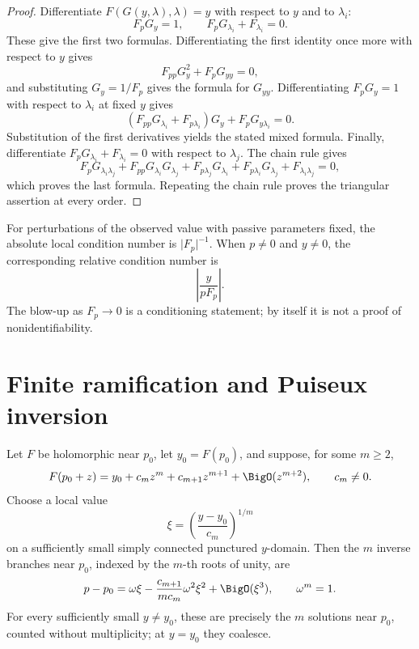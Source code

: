 \begin{proof}
Differentiate \(F(G(y,\lambda),\lambda)=y\) with respect to \(y\) and to
\(\lambda_i\):
\[
 F_pG_y=1,\qquad F_pG_{\lambda_i}+F_{\lambda_i}=0.
\]
These give the first two formulas.  Differentiating the first identity once
more with respect to \(y\) gives
\[
 F_{pp}G_y^2+F_pG_{yy}=0,
\]
and substituting \(G_y=1/F_p\) gives the formula for \(G_{yy}\).
Differentiating \(F_pG_y=1\) with respect to \(\lambda_i\) at fixed \(y\)
gives
\[
 (F_{pp}G_{\lambda_i}+F_{p\lambda_i})G_y
 +F_pG_{y\lambda_i}=0.
\]
Substitution of the first derivatives yields the stated mixed formula.
Finally, differentiate
\(F_pG_{\lambda_i}+F_{\lambda_i}=0\) with respect to
\(\lambda_j\).  The chain rule gives
\[
 F_pG_{\lambda_i\lambda_j}
 +F_{pp}G_{\lambda_i}G_{\lambda_j}
 +F_{p\lambda_j}G_{\lambda_i}
 +F_{p\lambda_i}G_{\lambda_j}
 +F_{\lambda_i\lambda_j}=0,
\]
which proves the last formula.  Repeating the chain rule proves the
triangular assertion at every order.
\end{proof}

\begin{remark}[Conditioning]
\label{rem:uq-inverse-conditioning}
For perturbations of the observed value with passive parameters fixed, the
absolute local condition number is \(\lvert F_p\rvert^{-1}\).  When
\(p\ne0\) and \(y\ne0\), the corresponding relative condition number is
\[
 \left\lvert\frac{y}{pF_p}\right\rvert.
\]
The blow-up as \(F_p\to0\) is a conditioning statement; by itself it is not
a proof of nonidentifiability.
\end{remark}

\section{Finite ramification and Puiseux inversion}
\label{sec:uq-puiseux}

\begin{theorem}
\label{thm:uq-finite-ramification}
Let \(F\) be holomorphic near \(p_0\), let \(y_0=F(p_0)\), and suppose, for
some \(m\ge2\),
\[
 F(p_0+z)
 =y_0+c_mz^m+c_{m+1}z^{m+1}+\BigO(z^{m+2}),
 \qquad c_m\ne0.
\]
Choose a local value
\[
 \xi=\left(\frac{y-y_0}{c_m}\right)^{1/m}
\]
on a sufficiently small simply connected punctured \(y\)-domain.  Then the
\(m\) inverse branches near \(p_0\), indexed by the \(m\)-th roots of unity,
are
\begin{equation}
\label{eq:uq-finite-ramification}
 p-p_0
 =\omega\xi-\frac{c_{m+1}}{mc_m}\omega^2\xi^2
 +\BigO(\xi^3),
 \qquad \omega^m=1.
\end{equation}
For every sufficiently small \(y\ne y_0\), these are precisely the \(m\)
solutions near \(p_0\), counted without multiplicity; at \(y=y_0\) they
coalesce.
\end{theorem}

